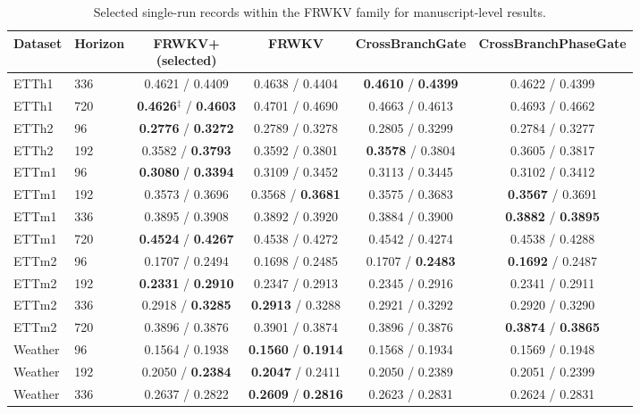 \documentclass[a4paper,fleqn]{cas-sc}
\begin{document}
\begin{table}[t]
\centering
\caption{Selected single-run records within the FRWKV family for manuscript-level results.}
\label{tab:seven}
\scriptsize
\begin{tabular}{llcccc}
\toprule
Dataset & Horizon & \shortstack{FRWKV+\\(selected)} & FRWKV & CrossBranchGate & CrossBranchPhaseGate \\
\midrule
ETTh1 & 336 & 0.4621 / 0.4409 & 0.4638 / 0.4404 & \textbf{0.4610} / \textbf{0.4399} & 0.4622 / 0.4399 \\
ETTh1 & 720 & \textbf{0.4626$^\ddagger$} / \textbf{0.4603} & 0.4701 / 0.4690 & 0.4663 / 0.4613 & 0.4693 / 0.4662 \\
ETTh2 & 96 & \textbf{0.2776} / \textbf{0.3272} & 0.2789 / 0.3278 & 0.2805 / 0.3299 & 0.2784 / 0.3277 \\
ETTh2 & 192 & 0.3582 / \textbf{0.3793} & 0.3592 / 0.3801 & \textbf{0.3578} / 0.3804 & 0.3605 / 0.3817 \\
ETTm1 & 96 & \textbf{0.3080} / \textbf{0.3394} & 0.3109 / 0.3452 & 0.3113 / 0.3445 & 0.3102 / 0.3412 \\
ETTm1 & 192 & 0.3573 / 0.3696 & 0.3568 / \textbf{0.3681} & 0.3575 / 0.3683 & \textbf{0.3567} / 0.3691 \\
ETTm1 & 336 & 0.3895 / 0.3908 & 0.3892 / 0.3920 & 0.3884 / 0.3900 & \textbf{0.3882} / \textbf{0.3895} \\
ETTm1 & 720 & \textbf{0.4524} / \textbf{0.4267} & 0.4538 / 0.4272 & 0.4542 / 0.4274 & 0.4538 / 0.4288 \\
ETTm2 & 96 & 0.1707 / 0.2494 & 0.1698 / 0.2485 & 0.1707 / \textbf{0.2483} & \textbf{0.1692} / 0.2487 \\
ETTm2 & 192 & \textbf{0.2331} / \textbf{0.2910} & 0.2347 / 0.2913 & 0.2345 / 0.2916 & 0.2341 / 0.2911 \\
ETTm2 & 336 & 0.2918 / \textbf{0.3285} & \textbf{0.2913} / 0.3288 & 0.2921 / 0.3292 & 0.2920 / 0.3290 \\
ETTm2 & 720 & 0.3896 / 0.3876 & 0.3901 / 0.3874 & 0.3896 / 0.3876 & \textbf{0.3874} / \textbf{0.3865} \\
Weather & 96 & 0.1564 / 0.1938 & \textbf{0.1560} / \textbf{0.1914} & 0.1568 / 0.1934 & 0.1569 / 0.1948 \\
Weather & 192 & 0.2050 / \textbf{0.2384} & \textbf{0.2047} / 0.2411 & 0.2050 / 0.2389 & 0.2051 / 0.2399 \\
Weather & 336 & 0.2637 / 0.2822 & \textbf{0.2609} / \textbf{0.2816} & 0.2623 / 0.2831 & 0.2624 / 0.2831 \\

\end{tabular}
\end{table}
\end{document}
